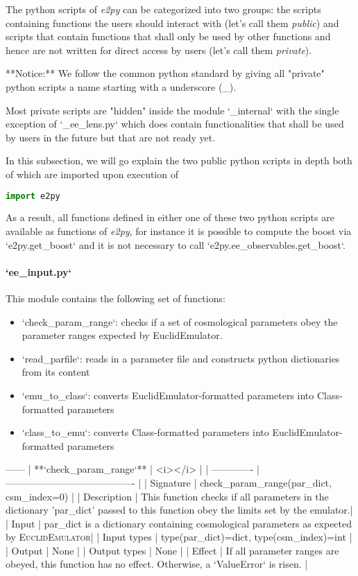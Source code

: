 \documentclass[american,11pt]{article}
\begin{document}
The python scripts of \textit{e2py} can be categorized into two groups: the scripts containing functions the users should interact with (let's call them \textit{public}) and scripts that contain functions that shall only be used by other functions and hence are not written for direct access by users (let's call them \textit{private}). 

**Notice:** We follow the common python standard by giving all "private" python scripts a name starting with a underscore (\_).  

Most private scripts are "hidden" inside the module `\_internal` with the single exception of `\_ee\_lens.py` which does contain functionalities that shall be used by users in the future but that are not ready yet.

In this subsection, we will go explain the two public python scripts in depth both of which are imported upon execution of

\begin{lstlisting}[language=python]
   import e2py
\end{lstlisting}

As a result, all functions defined in either one of these two python scripts are available as functions of \textit{e2py}, for instance it is possible to compute the boost via `e2py.get\_boost` and it is not necessary to call `e2py.ee\_observables.get\_boost`.

\paragraph{`ee\_input.py`}
This module contains the following set of functions:
\begin{itemize}
\item `check\_param\_range`: checks if a set of cosmological parameters obey the parameter ranges expected by EuclidEmulator.
\item `read\_parfile`: reads in a parameter file and constructs python dictionaries from its content
\item `emu\_to\_class`: converts EuclidEmulator-formatted parameters into Class-formatted parameters
\item `class\_to\_emu`: converts Class-formatted parameters into EuclidEmulator-formatted parameters
\end{itemize}
------
| **`check\_param\_range`** | <i></i> |
| ------------- | ---------------------------------------- |
| Signature | check\_param\_range(par\_dict, csm\_index=0) |
| Description | This function checks if all parameters in the dictionary 'par\_dict' passed to this function obey the limits set by the emulator.|
| Input | par\_dict is a dictionary containing cosmological parameters as expected by \textsc{EuclidEmulator}|
| Input types | type(par\_dict)=dict, type(csm\_index)=int |
| Output | None |
| Output types | None |
| Effect | If all parameter ranges are obeyed, this function has no effect. Otherwise, a `ValueError` is risen. |
\end{document}
